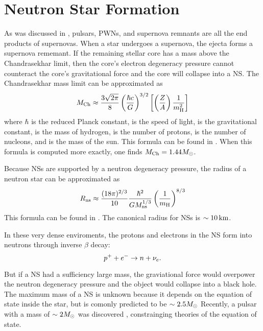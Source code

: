 \section{Neutron Star Formation}

As was discussed in , pulsars, 
\acp{PWN},
and supernova remnants are all the end products of supernovas.  When a
star undergoes a supernova, the ejecta forms a supernova rememant.  If the
remaining stellar core has a mass above the Chandrasekhar limit,
then the core's electron degeneracy pressure cannot counteract the core's
gravitational force and the core will collapse into a \ac{NS}.
The Chandrasekhar mass limit can be
approximated as \citep{chandrasekhar_1931_maximum-ideal}
\begin{equation}
  M_\text{Ch} \approx 
  \frac{3\sqrt{2\pi}}{8}
  \left(\frac{\hbar c}{G}\right)^{3/2}
  \left[
  \left(\frac{Z}{A}\right)
  \frac{1}{m_\text{H}^2}
  \right]
\end{equation}
where $\hbar$ is the reduced Planck constant, \speedoflight is the
speed of light, \gravitationalconstant is the gravitational constant,
\MassHydrogen is the mass of hydrogen, \NumberProtons is the
number of protons, \NumberNucleons is the number of nucleons, and
\solarmass is the mass of the sun.  This formula can be found in
\citep{carroll_2006_introduction-modern}.
When this formula is computed more exactly, 
one finds $M_\text{Ch} = 1.44 M_{\odot}$.

Because \acp{NS} are supported by a
neutron degeneracy pressure,
the radius of a neutron star can be approximated as
\begin{equation}
  R_\text{ns} \approx \frac{(18 \pi)^{2/3}}{10}
  \frac{\hbar^2}{G M_\text{ns}^{1/3}}
  \left(\frac{1}{m_\text{H}}\right)^{8/3}
\end{equation}
This formula can be found in \citep{carroll_2006_introduction-modern}.
The canonical radius for \acp{NS} is $\sim 10\,\text{km}$.

In these very dense enviroments, the protons and electrons in the \ac{NS}
form into neutrons through inverse $\beta$ decay:
\begin{equation}
  p^+ + e^- 
  \rightarrow n + \nu_e.
\end{equation}

But if a \ac{NS} had a sufficiency large mass, the graviational
force would overpower the neutron degeneracy pressure and the
object would collapse into a black hole. The maximum mass of a
\ac{NS} is unknown because it depends on the equation of state
inside the star, but is comonly predicted to be $\sim 2.5M_{\odot}$
Recently, a pulsar with a mass of $\sim 2M_{\odot}$ was discovered
\citep{demorest_2010_two-solar-mass-neutron}, constrainging
theories of the equation of state.

